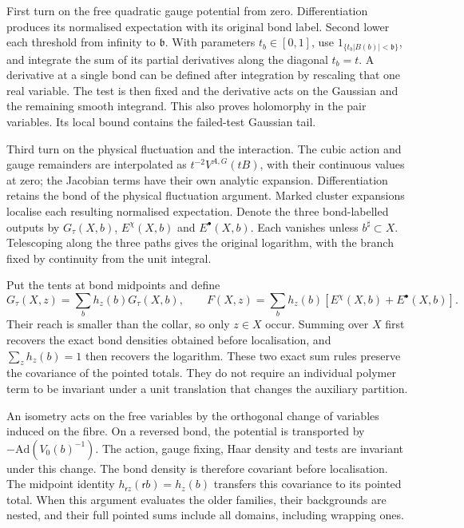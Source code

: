 \documentclass[11pt,letterpaper,reqno]{amsart}
\theoremstyle{definition}
\theoremstyle{remark}
\begin{document}
First turn on the free quadratic gauge potential from zero.
Differentiation produces its normalised expectation with its
original bond label. Second lower each threshold from infinity
to $\mathfrak b$. With parameters $t_b\in[0,1]$, use
$1_{\{t_b|B(b)|<\mathfrak b\}}$, and integrate the sum of its
partial derivatives along the diagonal $t_b=t$. A derivative
at a single bond can be defined after integration by rescaling
that one real variable. The test is then fixed and the
derivative acts on the Gaussian and the remaining smooth
integrand. This also proves holomorphy in the pair variables.
Its local bound contains the failed-test Gaussian tail.

Third turn on the physical fluctuation and the interaction.
The cubic action and gauge remainders are interpolated as
$t^{-2}V^{A,G}(tB)$, with their continuous values at zero;
the Jacobian terms have their own analytic expansion.
Differentiation retains the bond of the physical fluctuation
argument. Marked cluster expansions localise each resulting
normalised expectation. Denote the three bond-labelled
outputs by $G_\tau(X,b)$, $E^\chi(X,b)$ and
$E^\bullet(X,b)$. Each vanishes unless $b^\sharp\subset X$.
Telescoping along the three paths gives the original logarithm,
with the branch fixed by continuity from the unit integral.

Put the tents at bond midpoints and define
\[
 G_\tau(X,z)=\sum_bh_z(b)G_\tau(X,b),\qquad
 F(X,z)=\sum_bh_z(b)
                       [E^\chi(X,b)+E^\bullet(X,b)].
\]
Their reach is smaller than the collar, so only $z\in X$
occur. Summing over $X$ first recovers the exact bond
densities obtained before localisation, and $\sum_zh_z(b)=1$
then recovers the logarithm. These two exact sum rules preserve
the covariance of the pointed totals. They do not require an
individual polymer term to be invariant under a unit
translation that changes the auxiliary partition.

An isometry acts on the free variables by the orthogonal
change of variables induced on the fibre. On a reversed bond,
the potential is transported by
$-\mathrm{Ad}(V_0(b)^{-1})$. The action, gauge fixing, Haar
density and tests are invariant under this change. The
bond density is therefore covariant before localisation.
The midpoint identity $h_{\mathsf rz}(\mathsf rb)=h_z(b)$
transfers this covariance to its pointed total. When this
argument evaluates the older families, their backgrounds
are nested, and their full pointed sums include all domains,
including wrapping ones.
\end{document}
